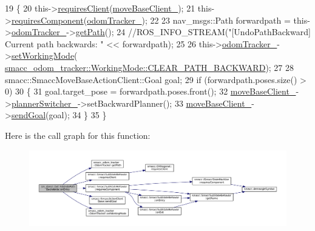 \begin{DoxyCode}
19   \{
20     this->\hyperlink{classsmacc_1_1SmaccSubStateBehavior_ae8361a9e794b02f9f3d962b881e4fd7d}{requiresClient}(\hyperlink{classsm__dance__bot_1_1SbUndoPathBackwards_adb2a5465cde104c31739daa299cdde2d}{moveBaseClient\_});
21     this->\hyperlink{classsmacc_1_1SmaccSubStateBehavior_a9f31f62f886cc06017e92fa0d834b12d}{requiresComponent}(\hyperlink{classsm__dance__bot_1_1SbUndoPathBackwards_aa35572a97ab8c00aac3d34c95c43e6bb}{odomTracker\_});
22 
23     nav\_msgs::Path forwardpath = this->\hyperlink{classsm__dance__bot_1_1SbUndoPathBackwards_aa35572a97ab8c00aac3d34c95c43e6bb}{odomTracker\_}->\hyperlink{classsmacc__odom__tracker_1_1OdomTracker_ace0762f93bc272a426d3038f74dc8752}{getPath}();
24     \textcolor{comment}{//ROS\_INFO\_STREAM("[UndoPathBackward] Current path backwards: " << forwardpath);}
25 
26     this->\hyperlink{classsm__dance__bot_1_1SbUndoPathBackwards_aa35572a97ab8c00aac3d34c95c43e6bb}{odomTracker\_}->\hyperlink{classsmacc__odom__tracker_1_1OdomTracker_a38fbca999297c46dc95628cc60851a45}{setWorkingMode}(
      \hyperlink{namespacesmacc__odom__tracker_ade9730dd5cc10ccfad9362176cf46c33a0cf8f27617189e35619df3c18bda6274}{smacc\_odom\_tracker::WorkingMode::CLEAR\_PATH\_BACKWARD});
27 
28     smacc::SmaccMoveBaseActionClient::Goal goal;
29     \textcolor{keywordflow}{if} (forwardpath.poses.size() > 0)
30     \{
31       goal.target\_pose = forwardpath.poses.front();
32       \hyperlink{classsm__dance__bot_1_1SbUndoPathBackwards_adb2a5465cde104c31739daa299cdde2d}{moveBaseClient\_}->\hyperlink{classsmacc_1_1SmaccMoveBaseActionClient_ae24164268108abf0b35cf51bfba5ec67}{plannerSwitcher\_}->setBackwardPlanner();
33       \hyperlink{classsm__dance__bot_1_1SbUndoPathBackwards_adb2a5465cde104c31739daa299cdde2d}{moveBaseClient\_}->\hyperlink{classsmacc_1_1SmaccActionClientBase_a2ec9e5fb96ecc517a815cda209eb1b51}{sendGoal}(goal);
34     \}
35   \}
\end{DoxyCode}


Here is the call graph for this function\+:
\nopagebreak
\begin{figure}[H]
\begin{center}
\leavevmode
\includegraphics[width=350pt]{classsm__dance__bot_1_1SbUndoPathBackwards_aeb54ed14aeaf2adbebf92b92e2384c73_cgraph}
\end{center}
\end{figure}




